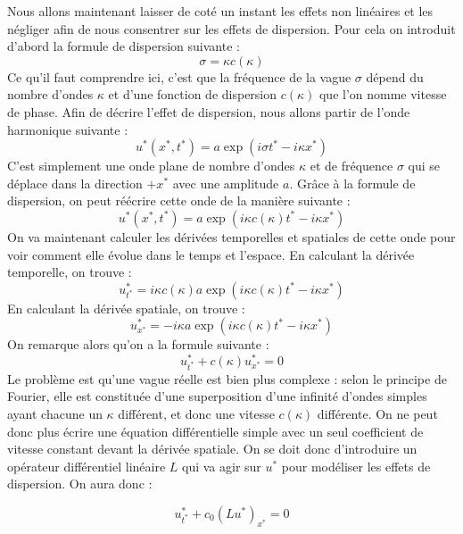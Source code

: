 Nous allons maintenant laisser de coté un instant les effets non linéaires et les négliger afin de nous consentrer sur les effets de dispersion. Pour cela on introduit d'abord la formule de dispersion suivante :
\begin{equation}
    \sigma = \kappa c (\kappa)
\end{equation}
Ce qu'il faut comprendre ici, c'est que la fréquence de la vague $\sigma$ dépend du nombre d'ondes $\kappa$ et d'une fonction de dispersion $c(\kappa)$ que l'on nomme vitesse de phase. Afin de décrire l'effet de dispersion, nous allons partir de l'onde harmonique suivante :
\begin{equation*}
    u^*(x^*,t^*) = a \exp(i \sigma t^* - i \kappa x^*)
\end{equation*}
C'est simplement une onde plane de nombre d'ondes $\kappa$ et de fréquence $\sigma$ qui se déplace dans la direction $+x^*$ avec une amplitude $a$. Grâce à la formule de dispersion, on peut réécrire cette onde de la manière suivante :
\begin{equation*}
    u^*(x^*,t^*) = a \exp(i \kappa c(\kappa) t^* - i \kappa x^*)
\end{equation*}
On va maintenant calculer les dérivées temporelles et spatiales de cette onde pour voir comment elle évolue dans le temps et l'espace. En calculant la dérivée temporelle, on trouve :
\begin{equation*}
    u^*_{t^*} = i \kappa c(\kappa) a \exp(i \kappa c(\kappa) t^* - i \kappa x^*)
\end{equation*}
En calculant la dérivée spatiale, on trouve :
\begin{equation*}
    u^*_{x^*} = -i \kappa a \exp(i \kappa c(\kappa) t^* - i \kappa x^*)
\end{equation*}
On remarque alors qu'on a la formule suivante :
\begin{equation*}
    u^*_{t^*} + c(\kappa) u^*_{x^*} = 0
\end{equation*}
Le problème est qu'une vague réelle est bien plus complexe : selon le principe de Fourier, elle est constituée d'une superposition d'une infinité d'ondes simples ayant chacune un $\kappa$ différent, et donc une vitesse $c(\kappa)$ différente. On ne peut donc plus écrire une équation différentielle simple avec un seul coefficient de vitesse constant devant la dérivée spatiale. On se doit donc d'introduire un opérateur différentiel linéaire $L$ qui va agir sur $u^*$ pour modéliser les effets de dispersion. On aura donc :

\begin{equation}
    u^*_{t^*} + c_0 (L u^*)_{x^*} = 0
\end{equation}


